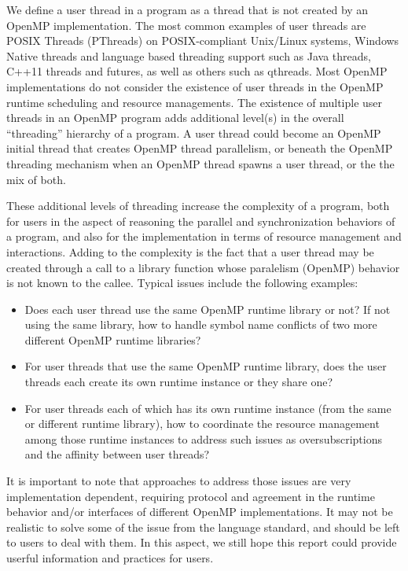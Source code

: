 We define a user thread in a program as a thread that is not created by an OpenMP implementation. 
The most common examples of user threads are POSIX Threads (PThreads) on POSIX-compliant Unix/Linux systems, 
Windows Native threads and language based threading support such as Java threads, C++11 threads and futures, as well as others such as qthreads. 
Most OpenMP implementations do not consider the existence of user threads in the OpenMP runtime scheduling and resource managements. 
The existence of multiple user threads in an OpenMP program adds additional level(s) in the overall ``threading''
hierarchy of a program. %
A user thread could become an OpenMP initial thread that creates OpenMP thread
parallelism, or beneath the OpenMP threading mechanism when an OpenMP thread spawns 
a user thread, or the the mix of both. 

These additional levels of threading increase the complexity of a program, both for 
users in the aspect of reasoning the parallel and synchronization behaviors of a program, 
and also for the implementation in terms of resource management and 
interactions. Adding to the complexity is the fact that a user thread may be created 
through a call to a library function whose paralelism (OpenMP) behavior is not known to 
the callee. Typical issues include the following examples: 
\begin{itemize}
\item Does each user thread use the same OpenMP runtime library or not? 
	If not using the same library, how to handle symbol name 
	conflicts of two more different OpenMP runtime libraries? 
\item For user threads that use the same OpenMP runtime library, does the user threads each create its own runtime instance or they share one?
\item For user threads each of which has its own runtime instance (from the same or 
	different runtime library), how to coordinate the resource management among those
	runtime instances to address such issues as oversubscriptions and the affinity
	between user threads?
\end{itemize}

It is important to note that approaches to address those issues are very implementation
dependent, requiring protocol and agreement in the runtime behavior and/or interfaces 
of different OpenMP implementations. It may not be realistic to solve some of the issue
from the language standard, and should be left to users to deal with them. In this
aspect, we still hope this report could provide userful information and practices 
for users. 

